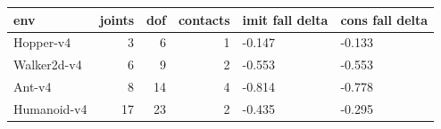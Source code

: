 \begin{tabular}{lrrrll}
\toprule
env & joints & dof & contacts & imit fall delta & cons fall delta \\
\midrule
Hopper-v4 & 3 & 6 & 1 & -0.147 & -0.133 \\
Walker2d-v4 & 6 & 9 & 2 & -0.553 & -0.553 \\
Ant-v4 & 8 & 14 & 4 & -0.814 & -0.778 \\
Humanoid-v4 & 17 & 23 & 2 & -0.435 & -0.295 \\
\bottomrule
\end{tabular}
